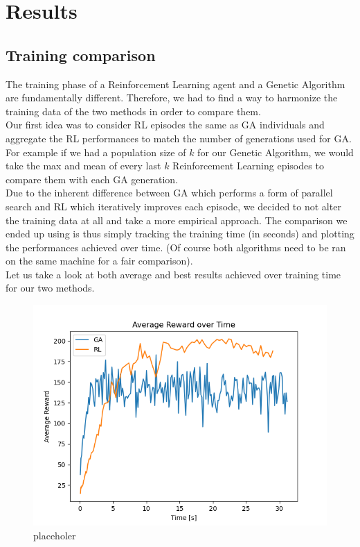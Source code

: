 \section{Results}

\subsection{Training comparison}

The training phase of a Reinforcement Learning agent and a Genetic Algorithm are fundamentally different.
Therefore, we had to find a way to harmonize the training data of the two methods in order to compare them.
\\
Our first idea was to consider RL episodes the same as GA individuals and aggregate the RL performances to match the number of generations used for GA.
For example if we had a population size of $k$ for our Genetic Algorithm, we would take the max and mean of every last $k$ Reinforcement Learning episodes to compare them with each GA generation.
\\
Due to the inherent difference between GA which performs a form of parallel search and RL which iteratively improves each episode, we decided to not alter the training data at all and take a more empirical approach.
The comparison we ended up using is thus simply tracking the training time (in seconds) and plotting the performances achieved over time. (Of course both algorithms need to be ran on the same machine for a fair comparison).
\\
Let us take a look at both average and best results achieved over training time for our two methods.

\begin{figure}[H]
	\centering
	\includegraphics [scale = 0.5]{Images/RL_GA_comparison_avg.png}
	\caption{placeholer}
	\label{figAVG}
\end{figure}

